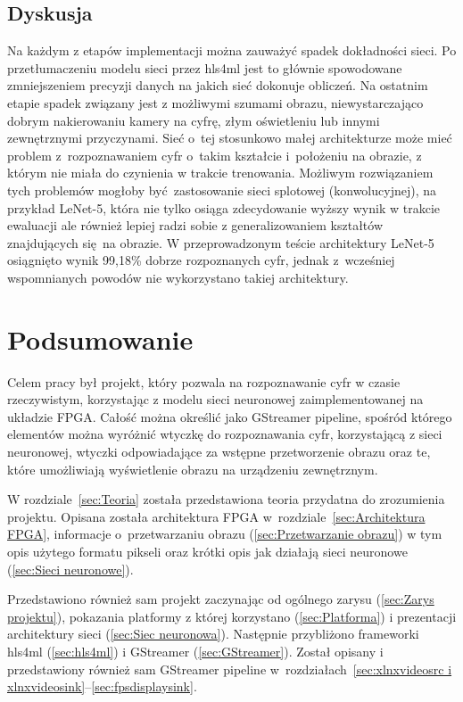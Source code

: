 \documentclass[12pt, oneside, a4paper]{article}
\begin{document}
\subsection{Dyskusja}\label{sec:Dyskusja}
Na każdym z etapów implementacji można zauważyć spadek dokładności sieci.
Po przetłumaczeniu modelu sieci przez hls4ml jest to głównie spowodowane
zmniejszeniem precyzji danych na jakich sieć dokonuje obliczeń. 
Na ostatnim etapie spadek związany jest z możliwymi szumami obrazu,
niewystarczająco dobrym nakierowaniu kamery na cyfrę, złym oświetleniu lub
innymi zewnętrznymi przyczynami. Sieć o~tej stosunkowo małej architekturze
może mieć problem z~rozpoznawaniem cyfr o~takim kształcie i~położeniu
na obrazie, z którym nie miała do czynienia w trakcie trenowania.
Możliwym rozwiązaniem tych problemów mogłoby być zastosowanie sieci
splotowej (konwolucyjnej), na przykład \mbox{LeNet-5}, która nie tylko
osiąga zdecydowanie wyższy wynik w trakcie ewaluacji ale również lepiej
radzi sobie z generalizowaniem kształtów znajdujących się na obrazie.
W przeprowadzonym teście architektury \mbox{LeNet-5} osiągnięto wynik
99,18\% dobrze rozpoznanych cyfr, jednak z~wcześniej
wspomnianych powodów nie wykorzystano takiej architektury.


\newpage
{}
\section*{Podsumowanie}
%
Celem pracy był projekt, który pozwala na
rozpoznawanie cyfr w czasie rzeczywistym, korzystając z modelu sieci
neuronowej zaimplementowanej na układzie FPGA. Całość można określić jako
GStreamer pipeline, spośród którego elementów można wyróżnić wtyczkę
do rozpoznawania cyfr, korzystającą z sieci neuronowej, wtyczki odpowiadające
za wstępne przetworzenie obrazu oraz te, które umożliwiają wyświetlenie obrazu
na urządzeniu zewnętrznym.

W rozdziale~\ref{sec:Teoria} została przedstawiona teoria przydatna
do zrozumienia projektu. Opisana została architektura FPGA
w~rozdziale~\ref{sec:Architektura FPGA}, informacje o~przetwarzaniu
obrazu (\ref{sec:Przetwarzanie obrazu}) w tym opis użytego formatu pikseli
oraz krótki opis jak działają sieci neuronowe (\ref{sec:Sieci neuronowe}).

Przedstawiono również sam projekt zaczynając od ogólnego
zarysu (\ref{sec:Zarys projektu}), pokazania platformy z której korzystano
(\ref{sec:Platforma}) i prezentacji architektury sieci (\ref{sec:Siec neuronowa}).
Następnie przybliżono frameworki hls4ml (\ref{sec:hls4ml})
i GStreamer (\ref{sec:GStreamer}). Został opisany i przedstawiony
również sam GStreamer pipeline
w~rozdziałach~\ref{sec:xlnxvideosrc i xlnxvideosink}--\ref{sec:fpsdisplaysink}.
\end{document}
